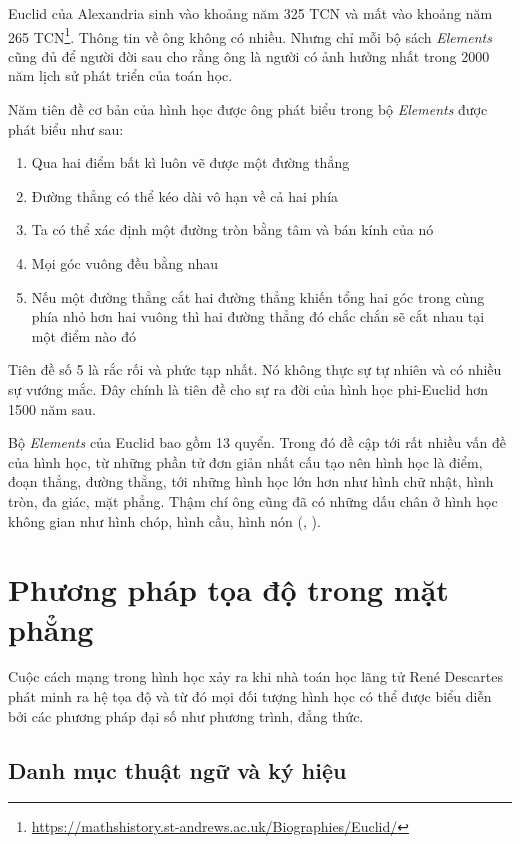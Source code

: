 Euclid của Alexandria sinh vào khoảng năm 325 TCN và mất vào khoảng năm 265 TCN\footnote{\url{https://mathshistory.st-andrews.ac.uk/Biographies/Euclid/}}. Thông tin về ông không có nhiều. Nhưng chỉ mỗi bộ sách \textit{Elements} cũng đủ để người đời sau cho rằng ông là người có ảnh hưởng nhất trong 2000 năm lịch sử phát triển của toán học.

Năm tiên đề cơ bản của hình học được ông phát biểu trong bộ \textit{Elements} được phát biểu như sau:

\begin{enumerate}
	\item Qua hai điểm bất kì luôn vẽ được một đường thẳng
	\item Đường thẳng có thể kéo dài vô hạn về cả hai phía
	\item Ta có thể xác định một đường tròn bằng tâm và bán kính của nó
	\item Mọi góc vuông đều bằng nhau
	\item Nếu một đường thẳng cắt hai đường thẳng khiến tổng hai góc trong cùng phía nhỏ hơn hai vuông thì hai đường thẳng đó chắc chắn sẽ cắt nhau tại một điểm nào đó
\end{enumerate}

Tiên đề số 5 là rắc rối và phức tạp nhất. Nó không thực sự tự nhiên và có nhiều sự vướng mắc. Đây chính là tiên đề cho sự ra đời của hình học phi-Euclid hơn 1500 năm sau.

Bộ \textit{Elements} của Euclid bao gồm 13 quyển. Trong đó đề cập tới rất nhiều vấn đề của hình học, từ những phần tử đơn giản nhất cấu tạo nên hình học là điểm, đoạn thẳng, đường thẳng, tới những hình học lớn hơn như hình chữ nhật, hình tròn, đa giác, mặt phẳng. Thậm chí ông cũng đã có những dấu chân ở hình học không gian như hình chóp, hình cầu, hình nón (\cite{Euclid}, \cite{Casey2007}).

\section{Phương pháp tọa độ trong mặt phẳng}

Cuộc cách mạng trong hình học xảy ra khi nhà toán học lãng tử René Descartes phát minh ra hệ tọa độ và từ đó mọi đối tượng hình học có thể được biểu diễn bởi các phương pháp đại số như phương trình, đẳng thức.

\subsection*{Danh mục thuật ngữ và ký hiệu}

